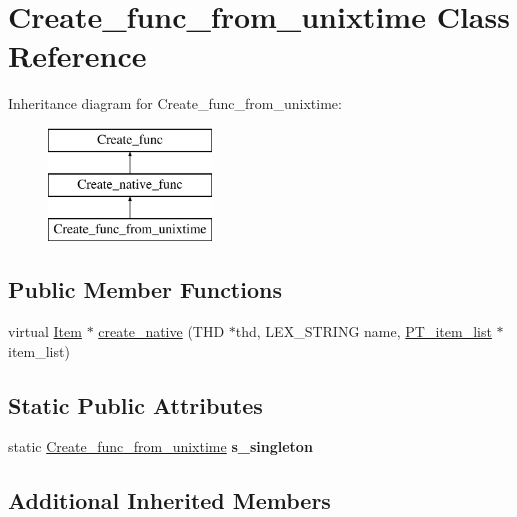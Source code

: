 \hypertarget{classCreate__func__from__unixtime}{}\section{Create\+\_\+func\+\_\+from\+\_\+unixtime Class Reference}
\label{classCreate__func__from__unixtime}
Inheritance diagram for Create\+\_\+func\+\_\+from\+\_\+unixtime\+:\begin{figure}[H]
\begin{center}
\leavevmode
\includegraphics[height=3.000000cm]{classCreate__func__from__unixtime}
\end{center}
\end{figure}
\subsection*{Public Member Functions}
\begin{DoxyCompactItemize}
\item 
virtual \mbox{\hyperlink{classItem}{Item}} $\ast$ \mbox{\hyperlink{classCreate__func__from__unixtime_ae8b86de49c1990a2b50667c52e6f126b}{create\+\_\+native}} (T\+HD $\ast$thd, L\+E\+X\+\_\+\+S\+T\+R\+I\+NG name, \mbox{\hyperlink{classPT__item__list}{P\+T\+\_\+item\+\_\+list}} $\ast$item\+\_\+list)
\end{DoxyCompactItemize}
\subsection*{Static Public Attributes}
\begin{DoxyCompactItemize}
\item 
\mbox{\label{classCreate__func__from__unixtime_a61c0114cefd97473f6b753910c05d025}} 
static \mbox{\hyperlink{classCreate__func__from__unixtime}{Create\+\_\+func\+\_\+from\+\_\+unixtime}} {\bfseries s\+\_\+singleton}
\end{DoxyCompactItemize}
\subsection*{Additional Inherited Members}


